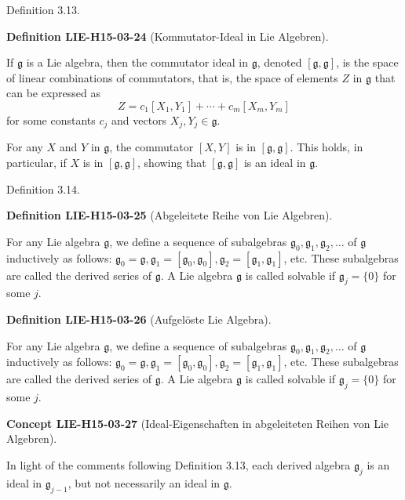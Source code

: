 \documentclass[10pt, letterpaper]{article}
\newcommand{\CustomHeading}[3]{%
  \par\medskip\noindent%
  \textbf{#1 #2} \textnormal{(#3)}.\enskip%
}
\newenvironment{DEF}[2]{\begin{unitbox}\CustomHeading{Definition}{#1}{#2}}{\end{unitbox}}
\newenvironment{CONC}[2]{\begin{unitbox}\CustomHeading{Concept}{#1}{#2}}{\end{unitbox}}
\begin{document}
Definition 3.13. 



\begin{DEF}{LIE-H15-03-24}{Kommutator-Ideal in Lie Algebren}
If $\mathfrak{g}$ is a Lie algebra, then the commutator ideal in $\mathfrak{g}$, denoted $[\mathfrak{g}, \mathfrak{g}]$, is the space of linear combinations of commutators, that is, the space of elements $Z$ in $\mathfrak{g}$ that can be expressed as
$$
Z=c_{1}\left[X_{1}, Y_{1}\right]+\cdots+c_{m}\left[X_{m}, Y_{m}\right]
$$
for some constants $c_{j}$ and vectors $X_{j}, Y_{j} \in \mathfrak{g}$.

For any $X$ and $Y$ in $\mathfrak{g}$, the commutator $[X, Y]$ is in $[\mathfrak{g}, \mathfrak{g}]$. This holds, in particular, if $X$ is in $[\mathfrak{g}, \mathfrak{g}]$, showing that $[\mathfrak{g}, \mathfrak{g}]$ is an ideal in $\mathfrak{g}$.
\end{DEF}



Definition 3.14. 

\begin{DEF}{LIE-H15-03-25}{Abgeleitete Reihe von Lie Algebren}
For any Lie algebra $\mathfrak{g}$, we define a sequence of subalgebras $\mathfrak{g}_{0}, \mathfrak{g}_{1}, \mathfrak{g}_{2}, \ldots$ of $\mathfrak{g}$ inductively as follows: $\mathfrak{g}_{0}=\mathfrak{g}, \mathfrak{g}_{1}=\left[\mathfrak{g}_{0}, \mathfrak{g}_{0}\right], \mathfrak{g}_{2}=\left[\mathfrak{g}_{1}, \mathfrak{g}_{1}\right]$, etc. These subalgebras are called the derived series of $\mathfrak{g}$. A Lie algebra $\mathfrak{g}$ is called solvable if $\mathfrak{g}_{j}=\{0\}$ for some $j$.
\end{DEF}


\begin{DEF}{LIE-H15-03-26}{Aufgelöste Lie Algebra}
For any Lie algebra $\mathfrak{g}$, we define a sequence of subalgebras $\mathfrak{g}_{0}, \mathfrak{g}_{1}, \mathfrak{g}_{2}, \ldots$ of $\mathfrak{g}$ inductively as follows: $\mathfrak{g}_{0}=\mathfrak{g}, \mathfrak{g}_{1}=\left[\mathfrak{g}_{0}, \mathfrak{g}_{0}\right], \mathfrak{g}_{2}=\left[\mathfrak{g}_{1}, \mathfrak{g}_{1}\right]$, etc. These subalgebras are called the derived series of $\mathfrak{g}$. A Lie algebra $\mathfrak{g}$ is called solvable if $\mathfrak{g}_{j}=\{0\}$ for some $j$.
\end{DEF}

\begin{CONC}{LIE-H15-03-27}{Ideal-Eigenschaften in abgeleiteten Reihen von Lie Algebren}
In light of the comments following Definition 3.13, each derived algebra $\mathfrak{g}_{j}$ is an ideal in $\mathfrak{g}_{j-1}$, but not necessarily an ideal in $\mathfrak{g}$.
\end{CONC}
\end{document}

